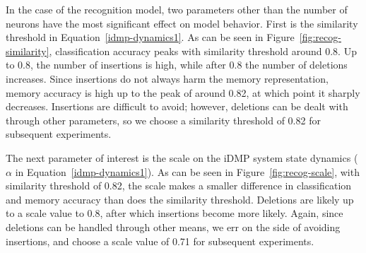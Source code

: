 In the case of the recognition model,
two parameters other than the number of neurons
have the most significant effect on model behavior.
First is the similarity threshold
in Equation~\eqref{idmp-dynamics1}.
As can be seen in Figure~\ref{fig:recog-similarity},
classification accuracy peaks with
similarity threshold around 0.8.
Up to 0.8, the number of insertions
is high, while after 0.8
the number of deletions increases.
Since insertions do not always harm
the memory representation,
memory accuracy is high
up to the peak of around 0.82,
at which point it sharply decreases.
Insertions are difficult to avoid;
however, deletions can be dealt
with through other parameters,
so we choose a similarity threshold of
0.82 for subsequent experiments.


The next parameter of interest is the
scale on the iDMP system state dynamics
($\alpha$ in Equation~\eqref{idmp-dynamics1}).
As can be seen in Figure~\ref{fig:recog-scale},
with similarity threshold of 0.82,
the scale makes a smaller difference
in classification and memory accuracy
than does the similarity threshold.
Deletions are likely up to
a scale value to 0.8,
after which insertions become more likely.
Again, since deletions can be handled
through other means,
we err on the side of avoiding insertions,
and choose a scale value of 0.71
for subsequent experiments.


